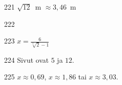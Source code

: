 \begin{Vastaus}{221}
		$\sqrt{12}$~m $\approx 3,46$~m
    
\end{Vastaus}
\begin{Vastaus}{222}
		\begin{alakohdat}
		\end{alakohdat}
    
\end{Vastaus}
\begin{Vastaus}{223}
	$x=\frac{6}{\sqrt[5]{2}-1}$
    
\end{Vastaus}
\begin{Vastaus}{224}
	Sivut ovat $5$ ja $12$.
    
\end{Vastaus}
\begin{Vastaus}{225}
	$x \approx 0,69$, $x \approx 1,86$ tai $x \approx 3,03$.
    
\end{Vastaus}
